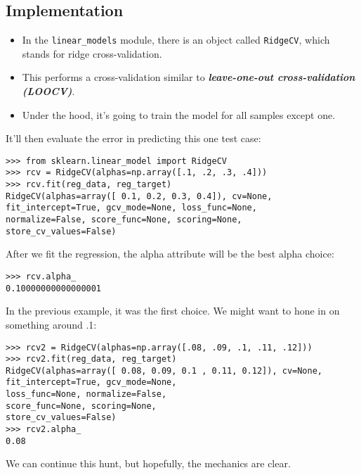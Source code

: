\documentclass[SKL-MASTER.tex]{subfiles}
\begin{document}
\subsection*{Implementation}
\begin{itemize}
\item In the \texttt{linear\_models} module, there is an object called \texttt{RidgeCV}, which stands
for ridge cross-validation. 
\item This performs a cross-validation similar to \textbf{\textit{leave-one-out
		cross-validation (LOOCV)}}.
\item Under the hood, it's going to train the model for all samples except one.
\end{itemize}
 It'll then
evaluate the error in predicting this one test case:
\begin{framed}
\begin{verbatim}
>>> from sklearn.linear_model import RidgeCV
>>> rcv = RidgeCV(alphas=np.array([.1, .2, .3, .4]))
>>> rcv.fit(reg_data, reg_target)
RidgeCV(alphas=array([ 0.1, 0.2, 0.3, 0.4]), cv=None,
fit_intercept=True, gcv_mode=None, loss_func=None,
normalize=False, score_func=None, scoring=None,
store_cv_values=False)
\end{verbatim}
\end{framed}
After we fit the regression, the alpha attribute will be the best alpha choice:
\begin{framed}
	\begin{verbatim}
>>> rcv.alpha_
0.10000000000000001
\end{verbatim}
\end{framed}
In the previous example, it was the first choice. We might want to hone in on something
around .1:
\begin{framed}
\begin{verbatim}
>>> rcv2 = RidgeCV(alphas=np.array([.08, .09, .1, .11, .12]))
>>> rcv2.fit(reg_data, reg_target)
RidgeCV(alphas=array([ 0.08, 0.09, 0.1 , 0.11, 0.12]), cv=None,
fit_intercept=True, gcv_mode=None,
loss_func=None, normalize=False,
score_func=None, scoring=None,
store_cv_values=False)
>>> rcv2.alpha_
0.08
\end{verbatim}
\end{framed}
We can continue this hunt, but hopefully, the mechanics are clear.
\end{document}

